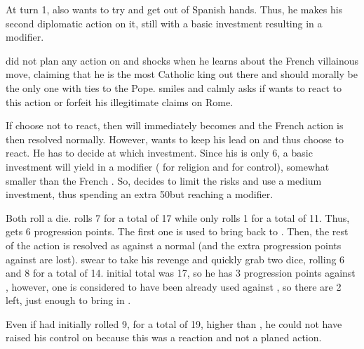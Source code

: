 \begin{exemple}[A reaction]
  At turn 1, \FRA also wants to try and get \paysPapaute out of Spanish
  hands. Thus, he makes his second diplomatic action on it, still with a basic
  investment resulting in a  modifier.

  \HIS did not plan any action on \paysPapaute and shocks when he learns about
  the French villainous move, claiming that he is the most Catholic king out
  there and should morally be the only one with ties to the Pope. \FRA smiles
  and calmly asks if \HIS wants to react to this action or forfeit his
  illegitimate claims on Rome.

  If \HIS choose not to react, then \paysPapaute will immediately becomes
  \Neutral and the French action is then resolved normally. However, \HIS
  wants to keep his lead on \paysPapaute and thus choose to react. He has to
  decide at which investment. Since his \DIP is only 6, a basic investment
  will yield in a  modifier ( for religion and 
  for control), somewhat smaller than the French . So, \HIS decides
  to limit the risks and use a medium investment, thus spending an extra
  50\ducats but reaching a  modifier.

  Both roll a die. \FRA rolls 7 for a total of 17 while \HIS only rolls 1 for
  a total of 11. Thus, \FRA gets 6 progression points. The first one is used
  to bring \paysPapaute back to \Neutral. Then, the rest of the action is
  resolved as against a normal \Neutral (and the extra progression points
  against \HIS are lost). \HIS swear to take his revenge and quickly grab two
  dice, rolling 6 and 8 for a total of 14. \FRA initial total was 17, so he
  has 3 progression points against \paysPapaute, however, one is considered to
  have been already used against \HIS, so there are 2 left, just enough to
  bring \paysPapaute in \SUB.

  \smallskip

  Even if \HIS had initially rolled 9, for a total of 19, higher than \FRA, he
  could not have raised his control on \paysPapaute because this was a
  reaction and not a planed action.
\end{exemple}

